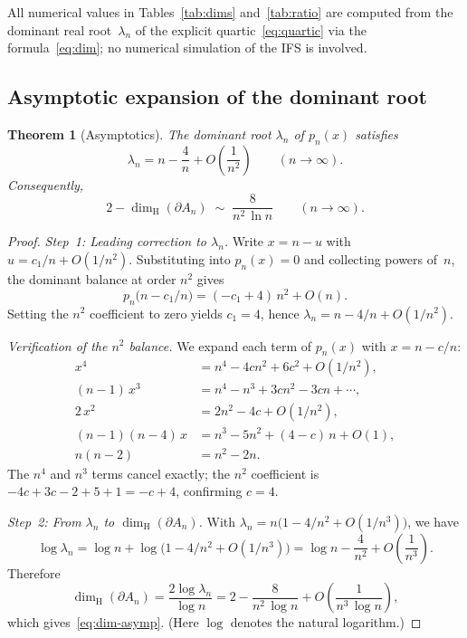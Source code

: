 \documentclass{amsart}
\newtheorem{theorem}{Theorem}[section]
\theoremstyle{definition}
\theoremstyle{remark}
\newcommand{\dH}{\dim_{\mathrm{H}}}
\begin{document}
All numerical values in Tables~\ref{tab:dims} and~\ref{tab:ratio}
are computed from the dominant real root~$\lambda_n$ of the
explicit quartic~\eqref{eq:quartic} via the
formula~\eqref{eq:dim}; no numerical simulation of the IFS is
involved.

\subsection{Asymptotic expansion of the dominant root}

\begin{theorem}[Asymptotics]\label{thm:asymp}
The dominant root $\lambda_n$ of $p_n(x)$ satisfies
\begin{equation}\label{eq:lambda-asymp}
  \lambda_n = n - \frac{4}{n} + O\!\left(\frac{1}{n^2}\right)
  \qquad (n \to \infty).
\end{equation}
Consequently,
\begin{equation}\label{eq:dim-asymp}
  2 - \dH(\partial A_n) \;\sim\; \frac{8}{n^2\,\ln n}
  \qquad (n \to \infty).
\end{equation}
\end{theorem}

\begin{proof}
\emph{Step~1: Leading correction to $\lambda_n$.}
Write $x = n - u$ with $u = c_1/n + O(1/n^2)$.
Substituting into $p_n(x) = 0$ and collecting powers of~$n$, the
dominant balance at order $n^2$ gives
\[
  p_n\bigl(n - c_1/n\bigr)
  = (-c_1 + 4)\,n^2 + O(n).
\]
Setting the $n^2$ coefficient to zero yields $c_1 = 4$, hence
$\lambda_n = n - 4/n + O(1/n^2)$.

\emph{Verification of the $n^2$ balance.}
We expand each term of $p_n(x)$ with $x = n - c/n$:
\begin{align*}
  x^4 &= n^4 - 4cn^2 + 6c^2 + O(1/n^2), \\
  (n{-}1)\,x^3 &= n^4 - n^3 + 3cn^2 - 3cn + \cdots, \\
  2\,x^2 &= 2n^2 - 4c + O(1/n^2), \\
  (n{-}1)(n{-}4)\,x &= n^3 - 5n^2 + (4{-}c)\,n + O(1), \\
  n(n{-}2) &= n^2 - 2n.
\end{align*}
The $n^4$ and $n^3$ terms cancel exactly; the $n^2$ coefficient is
$-4c + 3c - 2 + 5 + 1 = -c + 4$, confirming $c = 4$.

\emph{Step~2: From $\lambda_n$ to $\dH(\partial A_n)$.}
With $\lambda_n = n\bigl(1 - 4/n^2 + O(1/n^3)\bigr)$, we have
\[
  \log\lambda_n = \log n + \log\!\bigl(1 - 4/n^2 + O(1/n^3)\bigr)
  = \log n - \frac{4}{n^2} + O\!\left(\frac{1}{n^3}\right).
\]
Therefore
\[
  \dH(\partial A_n) = \frac{2\log\lambda_n}{\log n}
  = 2 - \frac{8}{n^2\,\log n} + O\!\left(\frac{1}{n^3\,\log n}\right),
\]
which gives~\eqref{eq:dim-asymp}.  (Here $\log$ denotes the natural
logarithm.)
\end{proof}
\end{document}
